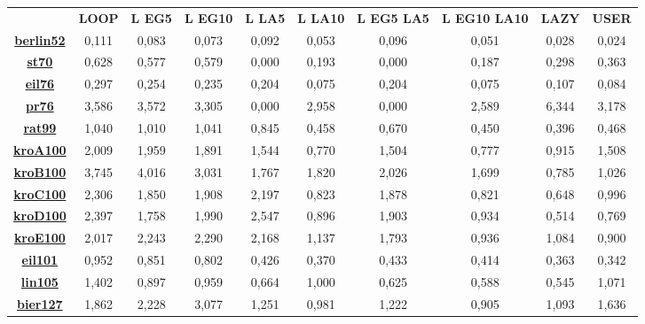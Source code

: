 \documentclass[11pt]{article}
\begin{document}
\begin{table}
\begin{adjustbox}{center}
\begin{tabular}{|c|c|c|c|c|c|c|c|c|c|}
    \cline{2-10} 
        \multicolumn{1}{c|}{} & \multirow{3}{*}{\textbf{LOOP}} & \multirow{3}{*}{\textbf{L EG5}} & \multirow{3}{*}{\textbf{L EG10}} & \multirow{3}{*}{\textbf{L LA5}} & \multirow{3}{*}{\textbf{L LA10}} & \multirow{3}{*}{\textbf{L EG5 LA5}} & \multirow{3}{*}{\textbf{L EG10 LA10}} & \multirow{3}{*}{\textbf{LAZY}} & \multirow{3}{*}{\textbf{USER}}\tabularnewline
        \multicolumn{1}{c|}{} &  &  &  &  &  &  &  &  & \tabularnewline
        \multicolumn{1}{c|}{} &  &  &  &  &  &  &  &  & \tabularnewline
        \hline 
        \textbf{\hyperref[fig:berlin52]{berlin52}} & 0,111 & 0,083 & 0,073 & 0,092 & 0,053 & 0,096 & 0,051 & 0,028 & 0,024\tabularnewline
        \hline 
        \textbf{\hyperref[fig:st70]{st70}} & 0,628 & 0,577 & 0,579 & 0,000 & 0,193 & 0,000 & 0,187 & 0,298 & 0,363\tabularnewline
        \hline 
        \textbf{\hyperref[fig:eil76]{eil76}} & 0,297 & 0,254 & 0,235 & 0,204 & 0,075 & 0,204 & 0,075 & 0,107 & 0,084\tabularnewline
        \hline 
        \textbf{\hyperref[fig:pr76]{pr76}} & 3,586 & 3,572 & 3,305 & 0,000 & 2,958 & 0,000 & 2,589 & 6,344 & 3,178\tabularnewline
        \hline 
        \textbf{\hyperref[fig:rat99]{rat99}} & 1,040 & 1,010 & 1,041 & 0,845 & 0,458 & 0,670 & 0,450 & 0,396 & 0,468\tabularnewline
        \hline 
        \textbf{\hyperref[fig:kroA100]{kroA100}} & 2,009 & 1,959 & 1,891 & 1,544 & 0,770 & 1,504 & 0,777 & 0,915 & 1,508\tabularnewline
        \hline 
        \textbf{\hyperref[fig:kroB100]{kroB100}} & 3,745 & 4,016 & 3,031 & 1,767 & 1,820 & 2,026 & 1,699 & 0,785 & 1,026\tabularnewline
        \hline 
        \textbf{\hyperref[fig:kroC100]{kroC100}} & 2,306 & 1,850 & 1,908 & 2,197 & 0,823 & 1,878 & 0,821 & 0,648 & 0,996\tabularnewline
        \hline 
        \textbf{\hyperref[fig:kroD100]{kroD100}} & 2,397 & 1,758 & 1,990 & 2,547 & 0,896 & 1,903 & 0,934 & 0,514 & 0,769\tabularnewline
        \hline 
        \textbf{\hyperref[fig:kroE100]{kroE100}} & 2,017 & 2,243 & 2,290 & 2,168 & 1,137 & 1,793 & 0,936 & 1,084 & 0,900\tabularnewline
        \hline 
        \textbf{\hyperref[fig:eil101]{eil101}} & 0,952 & 0,851 & 0,802 & 0,426 & 0,370 & 0,433 & 0,414 & 0,363 & 0,342\tabularnewline
        \hline 
        \textbf{\hyperref[fig:lin105]{lin105}} & 1,402 & 0,897 & 0,959 & 0,664 & 1,000 & 0,625 & 0,588 & 0,545 & 1,071\tabularnewline
        \hline 
        \textbf{\hyperref[fig:bier127]{bier127}} & 1,862 & 2,228 & 3,077 & 1,251 & 0,981 & 1,222 & 0,905 & 1,093 & 1,636\tabularnewline

\end{tabular}
\end{adjustbox}
\end{table}
\end{document}
